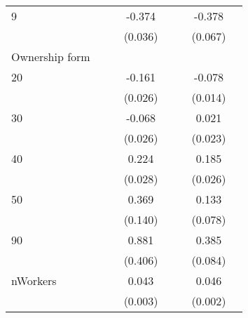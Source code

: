 \begin{longtable}{l*{3}{c}|l*{3}{c}}
		9                   &                     &                     &      -0.374\sym{***}&                     &                     &      -0.378\sym{***}\\
		&                     &                     &     (0.036)         &                     &                     &     (0.067)         \\
		Ownership form &&&&&\\
		20                  &                     &                     &      -0.161\sym{***}&                     &                     &      -0.078\sym{***}\\
		&                     &                     &     (0.026)         &                     &                     &     (0.014)         \\
		30                  &                     &                     &      -0.068\sym{**} &                     &                     &       0.021         \\
		&                     &                     &     (0.026)         &                     &                     &     (0.023)         \\
		40                  &                     &                     &       0.224\sym{***}&                     &                     &       0.185\sym{***}\\
		&                     &                     &     (0.028)         &                     &                     &     (0.026)         \\
		50                  &                     &                     &       0.369\sym{**} &                     &                     &       0.133         \\
		&                     &                     &     (0.140)         &                     &                     &     (0.078)         \\
		90                  &                     &                     &       0.881\sym{*}  &                     &                     &       0.385\sym{***}\\
		&                     &                     &     (0.406)         &                     &                     &     (0.084)         \\
		nWorkers            &                     &                     &       0.043\sym{***}&                     &                     &       0.046\sym{***}\\
		&                     &                     &     (0.003)         &                     &                     &     (0.002)         \\

\end{longtable}
